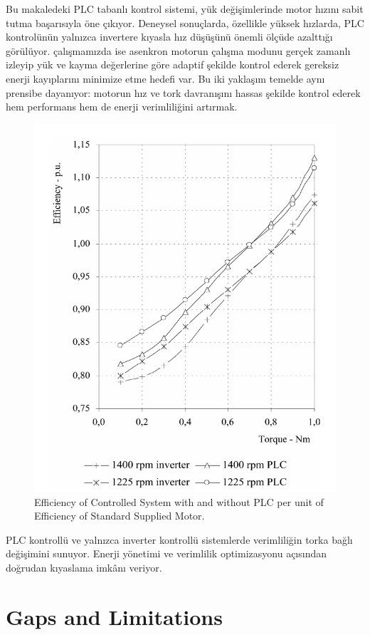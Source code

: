 Bu makaledeki PLC tabanlı kontrol sistemi, yük değişimlerinde motor hızını sabit tutma başarısıyla öne çıkıyor. Deneysel sonuçlarda, özellikle yüksek hızlarda, PLC kontrolünün yalnızca invertere kıyasla hız düşüşünü önemli ölçüde azalttığı görülüyor. çalışmamızda ise asenkron motorun çalışma modunu gerçek zamanlı izleyip yük ve kayma değerlerine göre adaptif şekilde kontrol ederek gereksiz enerji kayıplarını minimize etme hedefi var. Bu iki yaklaşım temelde aynı prensibe dayanıyor: motorun hız ve tork davranışını hassas şekilde kontrol ederek hem performans hem de enerji verimliliğini artırmak.

\begin{figure}[H]
    \centering
    \includegraphics[width=0.4\columnwidth]{imgs/Efficiency of controlled system with and without PLC per unit of efficiency of standard supplied motor..png}
    \caption[Short description for list of figures]{Efficiency of Controlled System with and without PLC per unit of Efficiency of Standard Supplied Motor.}
    \label{fig-magnitude}
    \end{figure}%

PLC kontrollü ve yalnızca inverter kontrollü sistemlerde verimliliğin torka bağlı değişimini sunuyor. Enerji yönetimi ve verimlilik optimizasyonu açısından doğrudan kıyaslama imkânı veriyor.

\section{Gaps and Limitations}


